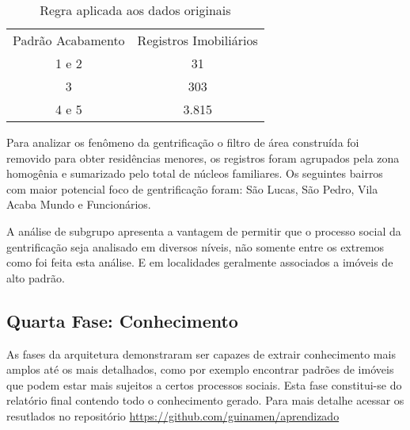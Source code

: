 \documentclass[12pt]{article}
\begin{document}
\begin{table}[ht]
\centering
\label{table:sub}
\caption{Subgrupo escolhido}
\end{table}

\begin{table}[!htbp]
\centering
\label{table:sub-aca}
\begin{tabular}{cc}
 Padrão Acabamento & Registros Imobiliários  \\
 1 e 2 & 31 \\
 3 & 303 \\
 4 e 5 & 3.815 \\
\end{tabular}
\caption{Regra aplicada aos dados originais}
\end{table}

Para analizar os fenômeno da gentrificação o filtro de área construída foi removido para obter residências menores, os registros foram agrupados pela zona homogênia e sumarizado pelo total de núcleos familiares. Os seguintes bairros com maior potencial foco de gentrificação foram: São Lucas, São Pedro, Vila Acaba Mundo e Funcionários.

A análise de subgrupo apresenta a vantagem de permitir que o processo social da gentrificação seja analisado em diversos níveis, não somente entre os extremos como foi feita esta análise. E em localidades geralmente associados a imóveis de alto padrão.

\subsection{Quarta Fase: Conhecimento}
As fases da arquitetura demonstraram ser capazes de extrair conhecimento mais amplos até os mais detalhados, como por exemplo encontrar padrões de imóveis que podem estar mais sujeitos a certos processos sociais. Esta fase constitui-se do relatório final contendo todo o conhecimento gerado. Para mais detalhe acessar os resutlados no repositório \href{https://github.com/guinamen/aprendizado}{https://github.com/guinamen/aprendizado}
\end{document}
